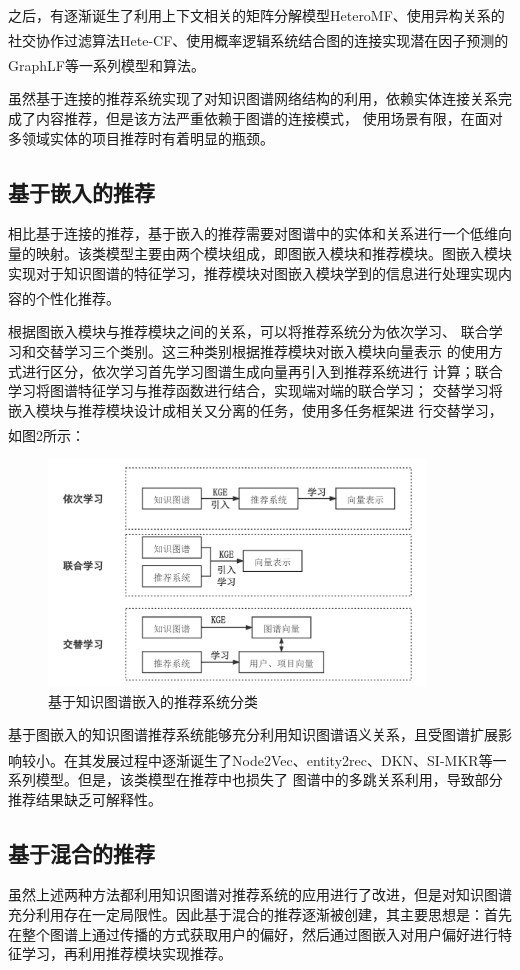 \documentclass{article}
\newcommand{\upcite}[1]{\textsuperscript{\textsuperscript{\cite{#1}}}}
\begin{document}
	之后，有逐渐诞生了利用上下文相关的矩阵分解模型HeteroMF\upcite{4}、使用异构关系的社交协作过滤算法Hete-CF\upcite{5}、使用概率逻辑系统结合图的连接实现潜在因子预测的GraphLF\upcite{6}等一系列模型和算法。
	
	虽然基于连接的推荐系统实现了对知识图谱网络结构的利用，依赖实体连接关系完成了内容推荐，但是该方法严重依赖于图谱的连接模式， 使用场景有限，在面对多领域实体的项目推荐时有着明显的瓶颈。

	\subsection{基于嵌入的推荐}
	相比基于连接的推荐，基于嵌入的推荐需要对图谱中的实体和关系进行一个低维向量的映射。该类模型主要由两个模块组成，即图嵌入模块和推荐模块。图嵌入模块实现对于知识图谱的特征学习，推荐模块对图嵌入模块学到的信息进行处理实现内容的个性化推荐\upcite{1}。
	
	根据图嵌入模块与推荐模块之间的关系，可以将推荐系统分为依次学习、
	联合学习和交替学习三个类别。这三种类别根据推荐模块对嵌入模块向量表示
	的使用方式进行区分，依次学习首先学习图谱生成向量再引入到推荐系统进行
	计算；联合学习将图谱特征学习与推荐函数进行结合，实现端对端的联合学习；
	交替学习将嵌入模块与推荐模块设计成相关又分离的任务，使用多任务框架进
	行交替学习，如图2\upcite{7}所示：
	
	\begin{figure}[H]
		\centering
		\includegraphics[width=10cm]{p2.png}%
		\vspace{-0.5cm}
		\caption{基于知识图谱嵌入的推荐系统分类} %
	\end{figure}
	基于图嵌入的知识图谱推荐系统能够充分利用知识图谱语义关系，且受图谱扩展影响较小。在其发展过程中逐渐诞生了Node2Vec\upcite{8}、entity2rec\upcite{9}、DKN\upcite{10}、SI-MKR\upcite{11}等一系列模型。但是，该类模型在推荐中也损失了	图谱中的多跳关系利用，导致部分推荐结果缺乏可解释性。
	
	 \subsection{基于混合的推荐}
	虽然上述两种方法都利用知识图谱对推荐系统的应用进行了改进，但是对知识图谱充分利用存在一定局限性。因此基于混合的推荐逐渐被创建，其主要思想是：首先在整个图谱上通过传播的方式获取用户的偏好，然后通过图嵌入对用户偏好进行特征学习，再利用推荐模块实现推荐。
	
\end{document}
